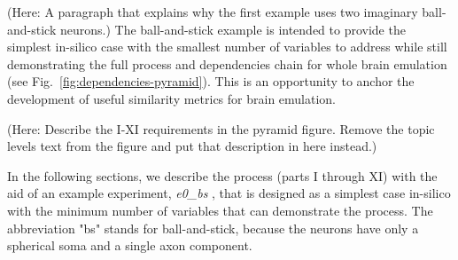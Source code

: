 \documentclass{ldr-article}
\def\firstexp{\textit{e0\_bs} }
\begin{document}







(Here: A paragraph that explains why the first example uses two imaginary ball-and-stick neurons.)
The ball-and-stick example is intended to provide the simplest in-silico case with the smallest
number of variables to address while still demonstrating the full process and dependencies
chain for whole brain emulation (see Fig.~\ref{fig:dependencies-pyramid}). This is an opportunity to anchor the development of useful similarity metrics for brain emulation.

(Here: Describe the I-XI requirements in the pyramid figure. Remove the topic levels text from the figure and put that description in here instead.)

In the following sections, we describe the process (parts I through XI) with the aid of an example experiment, \firstexp, that is designed as a simplest case in-silico with the minimum number of variables that can demonstrate the process. The abbreviation "bs" stands for ball-and-stick, because the neurons have only a spherical soma and a single axon component.

\end{document}
